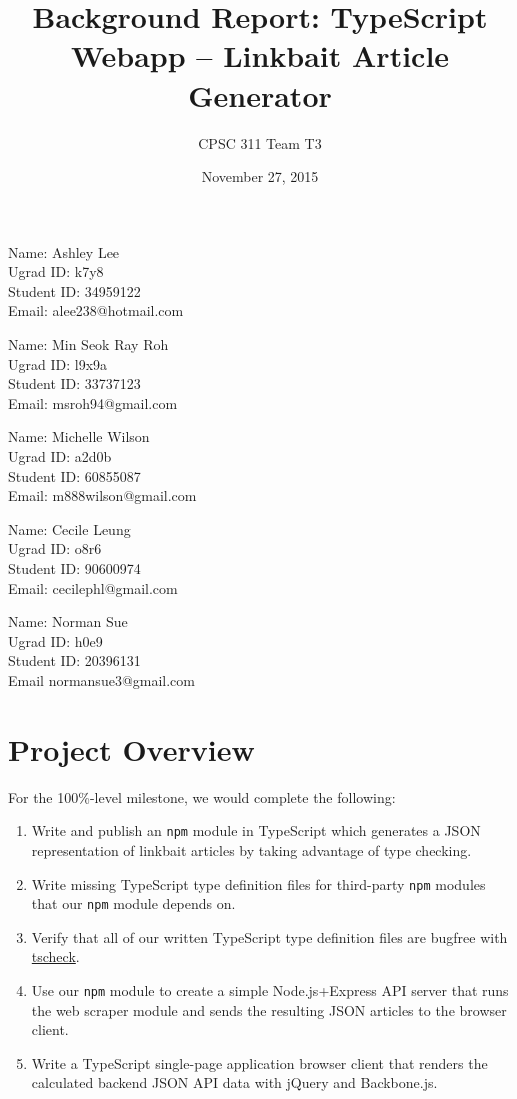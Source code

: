 \documentclass[]{article}
\title{Background Report: TypeScript Webapp -- Linkbait Article Generator}
\author{CPSC 311 Team T3}
\date{November 27, 2015}
\begin{document}
\maketitle

Name: Ashley Lee\\Ugrad ID: k7y8\\Student ID: 34959122\\Email:
alee238@hotmail.com

Name: Min Seok Ray Roh\\Ugrad ID: l9x9a\\Student ID: 33737123\\Email:
msroh94@gmail.com

Name: Michelle Wilson\\Ugrad ID: a2d0b\\Student ID: 60855087\\Email:
m888wilson@gmail.com

Name: Cecile Leung\\Ugrad ID: o8r6\\Student ID: 90600974\\Email:
cecilephl@gmail.com

Name: Norman Sue\\Ugrad ID: h0e9\\Student ID: 20396131\\Email
normansue3@gmail.com

\section{Project Overview}\label{project-overview}

For the 100\%-level milestone, we would complete the following:

\begin{enumerate}
\def\labelenumi{\arabic{enumi}.}
\itemsep1pt\parskip0pt
\item
  Write and publish an \texttt{npm} module in TypeScript which generates
  a JSON representation of linkbait articles by taking advantage of type
  checking.
\item
  Write missing TypeScript type definition files for third-party
  \texttt{npm} modules that our \texttt{npm} module depends on.
\item
  Verify that all of our written TypeScript type definition files are
  bugfree with
  \href{https://github.com/asgerf/tscheck}{tscheck}.\cite{ref1}
\item
  Use our \texttt{npm} module to create a simple Node.js+Express API
  server that runs the web scraper module and sends the resulting JSON
  articles to the browser client.
\item
  Write a TypeScript single-page application browser client that renders
  the calculated backend JSON API data with jQuery and Backbone.js.
\end{enumerate}
\end{document}
